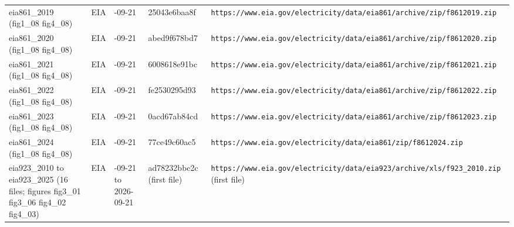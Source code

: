 \begin{longtable}{>{\raggedright\arraybackslash}p{3.0cm}>{\raggedright\arraybackslash}p{1.5cm}>{\raggedright\arraybackslash}p{1.4cm}>{\raggedright\arraybackslash}p{2.0cm}>{\raggedright\arraybackslash}p{6.0cm}}
eia861\_\allowbreak{}2019 (fig1\_\allowbreak{}08 fig4\_\allowbreak{}08) & EIA & 2026-09-21 & 25043e6baa8f & \texttt{https:\allowbreak{}/\allowbreak{}/\allowbreak{}www.\allowbreak{}eia.\allowbreak{}gov/\allowbreak{}electricity/\allowbreak{}data/\allowbreak{}eia861/\allowbreak{}archive/\allowbreak{}zip/\allowbreak{}f8612019.\allowbreak{}zip} \\
eia861\_\allowbreak{}2020 (fig1\_\allowbreak{}08 fig4\_\allowbreak{}08) & EIA & 2026-09-21 & abed9f678bd7 & \texttt{https:\allowbreak{}/\allowbreak{}/\allowbreak{}www.\allowbreak{}eia.\allowbreak{}gov/\allowbreak{}electricity/\allowbreak{}data/\allowbreak{}eia861/\allowbreak{}archive/\allowbreak{}zip/\allowbreak{}f8612020.\allowbreak{}zip} \\
eia861\_\allowbreak{}2021 (fig1\_\allowbreak{}08 fig4\_\allowbreak{}08) & EIA & 2026-09-21 & 6008618e91bc & \texttt{https:\allowbreak{}/\allowbreak{}/\allowbreak{}www.\allowbreak{}eia.\allowbreak{}gov/\allowbreak{}electricity/\allowbreak{}data/\allowbreak{}eia861/\allowbreak{}archive/\allowbreak{}zip/\allowbreak{}f8612021.\allowbreak{}zip} \\
eia861\_\allowbreak{}2022 (fig1\_\allowbreak{}08 fig4\_\allowbreak{}08) & EIA & 2026-09-21 & fe2530295d93 & \texttt{https:\allowbreak{}/\allowbreak{}/\allowbreak{}www.\allowbreak{}eia.\allowbreak{}gov/\allowbreak{}electricity/\allowbreak{}data/\allowbreak{}eia861/\allowbreak{}archive/\allowbreak{}zip/\allowbreak{}f8612022.\allowbreak{}zip} \\
eia861\_\allowbreak{}2023 (fig1\_\allowbreak{}08 fig4\_\allowbreak{}08) & EIA & 2026-09-21 & 0acd67ab84cd & \texttt{https:\allowbreak{}/\allowbreak{}/\allowbreak{}www.\allowbreak{}eia.\allowbreak{}gov/\allowbreak{}electricity/\allowbreak{}data/\allowbreak{}eia861/\allowbreak{}archive/\allowbreak{}zip/\allowbreak{}f8612023.\allowbreak{}zip} \\
eia861\_\allowbreak{}2024 (fig1\_\allowbreak{}08 fig4\_\allowbreak{}08) & EIA & 2026-09-21 & 77ce49c60ac5 & \texttt{https:\allowbreak{}/\allowbreak{}/\allowbreak{}www.\allowbreak{}eia.\allowbreak{}gov/\allowbreak{}electricity/\allowbreak{}data/\allowbreak{}eia861/\allowbreak{}zip/\allowbreak{}f8612024.\allowbreak{}zip} \\
eia923\_\allowbreak{}2010 to eia923\_\allowbreak{}2025 (16 files; figures fig3\_\allowbreak{}01 fig3\_\allowbreak{}06 fig4\_\allowbreak{}02 fig4\_\allowbreak{}03) & EIA & 2026-09-21 to 2026-09-21 & ad78232bbc2c (first file) & \texttt{https:\allowbreak{}/\allowbreak{}/\allowbreak{}www.\allowbreak{}eia.\allowbreak{}gov/\allowbreak{}electricity/\allowbreak{}data/\allowbreak{}eia923/\allowbreak{}archive/\allowbreak{}xls/\allowbreak{}f923\_\allowbreak{}2010.\allowbreak{}zip} (first file) \\

\end{longtable}
